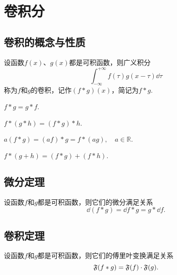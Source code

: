 
\chapter{卷积分}

\section{卷积的概念与性质}
\begin{definition}
设函数\(f(x)\)、\(g(x)\)都是可积函数，则广义积分\[
\int_{-\infty}^{+\infty} f(\tau) g(x - \tau) \dd{\tau}
\]称为\(f\)和\(g\)的卷积，记作\((f * g)(x)\)，简记为\(f*g\).
\end{definition}

\begin{property}[交换律]
\(f*g = g*f\).
\end{property}

\begin{property}[结合律 I]
\(f*(g*h) = (f*g)*h\).
\end{property}

\begin{property}[结合律 II]
\(a (f*g) = (a f)*g = f*(a g), \quad a \in \mathbb{R}\).
\end{property}

\begin{property}[分配律]
\(f*(g+h)=(f*g)+(f*h)\).
\end{property}

\section{微分定理}
\begin{theorem}
设函数\(f\)和\(g\)都是可积函数，则它们的微分满足关系\[
\dd(f*g) = \dd{f}*g = g*\dd{f}.
\]
\end{theorem}

\section{卷积定理}
\begin{theorem}
设函数\(f\)和\(g\)都是可积函数，则它们的傅里叶变换满足关系\[
\mathfrak{F}(f*g) = \mathfrak{F}(f) \cdot \mathfrak{F}(g).
\]
\end{theorem}

